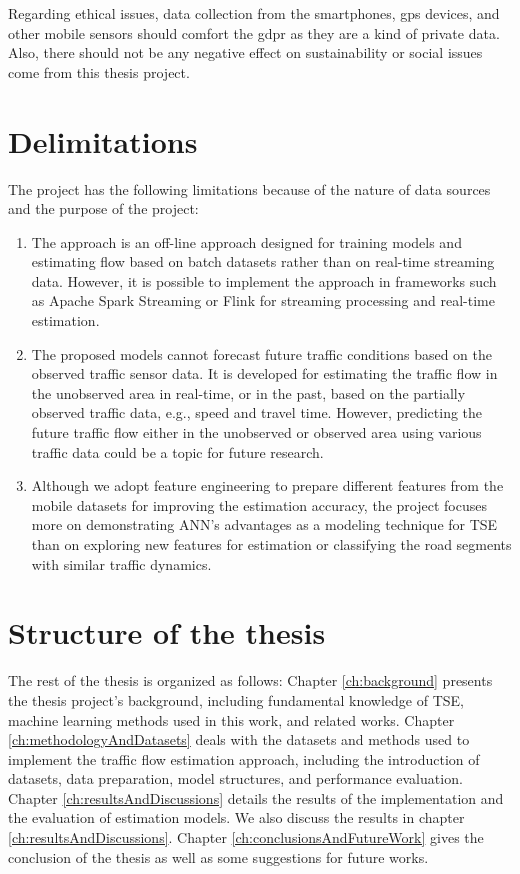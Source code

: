 \documentclass[english]{kththesis}
\begin{document}
Regarding ethical issues, data collection from the smartphones, \gls{gps} devices, and other mobile sensors should comfort the \gls{gdpr} as they are a kind of private data. Also, there should not be any negative effect on sustainability or social issues come from this thesis project.

\section{Delimitations}
\label{sec:delimitations}
The project has the following limitations because of the nature of data sources and the purpose of the project:
\begin{enumerate}
    \item The approach is an off-line approach designed for training models and estimating flow based on batch datasets rather than on real-time streaming data. However, it is possible to implement the approach in frameworks such as Apache Spark Streaming or Flink for streaming processing and real-time estimation. 
    \item The proposed models cannot forecast future traffic conditions based on the observed traffic sensor data. It is developed for estimating the traffic flow in the unobserved area in real-time, or in the past, based on the partially observed traffic data, e.g., speed and travel time. However, predicting the future traffic flow either in the unobserved or observed area using various traffic data could be a topic for future research.
    \item Although we adopt feature engineering to prepare different features from the mobile datasets for improving the estimation accuracy, the project focuses more on demonstrating ANN's advantages as a modeling technique for TSE than on exploring new features for estimation or classifying the road segments with similar traffic dynamics.
\end{enumerate}


\section{Structure of the thesis}
\label{sec:structureOfThesis}
The rest of the thesis is organized as follows: Chapter \ref{ch:background} presents the thesis project's background, including fundamental knowledge of TSE, machine learning methods used in this work, and related works. Chapter \ref{ch:methodologyAndDatasets} deals with the datasets and methods used to implement the traffic flow estimation approach, including the introduction of datasets, data preparation, model structures, and performance evaluation. Chapter \ref{ch:resultsAndDiscussions} details the results of the implementation and the evaluation of estimation models. We also discuss the results in chapter \ref{ch:resultsAndDiscussions}. Chapter \ref{ch:conclusionsAndFutureWork} gives the conclusion of the thesis as well as some suggestions for future works.
\end{document}
